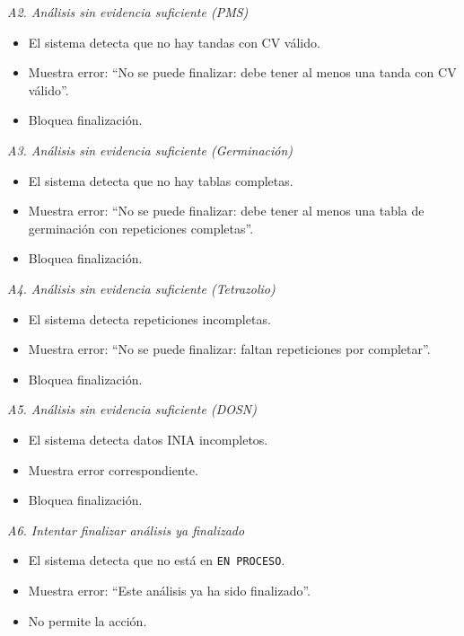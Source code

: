 \vspace{0.3em}
\noindent\textit{A2. Análisis sin evidencia suficiente (PMS)}
\begin{itemize}[nosep]
    \item El sistema detecta que no hay tandas con CV válido.
    \item Muestra error: ``No se puede finalizar: debe tener al menos una tanda con CV válido''.
    \item Bloquea finalización.
\end{itemize}

\vspace{0.3em}
\noindent\textit{A3. Análisis sin evidencia suficiente (Germinación)}
\begin{itemize}[nosep]
    \item El sistema detecta que no hay tablas completas.
    \item Muestra error: ``No se puede finalizar: debe tener al menos una tabla de germinación con repeticiones completas''.
    \item Bloquea finalización.
\end{itemize}

\vspace{0.3em}
\noindent\textit{A4. Análisis sin evidencia suficiente (Tetrazolio)}
\begin{itemize}[nosep]
    \item El sistema detecta repeticiones incompletas.
    \item Muestra error: ``No se puede finalizar: faltan repeticiones por completar''.
    \item Bloquea finalización.
\end{itemize}

\vspace{0.3em}
\noindent\textit{A5. Análisis sin evidencia suficiente (DOSN)}
\begin{itemize}[nosep]
    \item El sistema detecta datos INIA incompletos.
    \item Muestra error correspondiente.
    \item Bloquea finalización.
\end{itemize}

\vspace{0.3em}
\noindent\textit{A6. Intentar finalizar análisis ya finalizado}
\begin{itemize}[nosep]
    \item El sistema detecta que no está en \texttt{EN PROCESO}.
    \item Muestra error: ``Este análisis ya ha sido finalizado''.
    \item No permite la acción.
\end{itemize}

